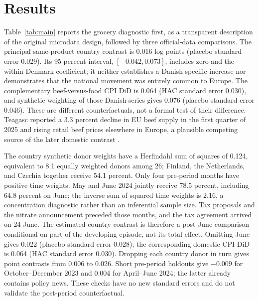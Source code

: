 \documentclass[11pt]{article}
\begin{document}
\section{Results}\label{sec:results}
Table~\ref{tab:main} reports the grocery diagnostic first, as a transparent description of the original microdata design, followed by three official-data comparisons. The principal same-product country contrast is 0.016 log points (placebo standard error 0.029). Its 95 percent interval, $[-0.042,0.073]$, includes zero and the within-Denmark coefficient; it neither establishes a Danish-specific increase nor demonstrates that the national movement was entirely common to Europe. The complementary beef-versus-food CPI DiD is 0.064 (HAC standard error 0.030), and synthetic weighting of those Danish series gives 0.076 (placebo standard error 0.046). These are different counterfactuals, not a formal test of their difference. Teagasc reported a 3.3 percent decline in EU beef supply in the first quarter of 2025 and rising retail beef prices elsewhere in Europe, a plausible competing source of the later domestic contrast \citep{teagasc2025beef}.

The country synthetic donor weights have a Herfindahl sum of squares of 0.124, equivalent to 8.1 equally weighted donors among 26; Finland, the Netherlands, and Czechia together receive 54.1 percent. Only four pre-period months have positive time weights. May and June 2024 jointly receive 78.5 percent, including 64.8 percent on June; the inverse sum of squared time weights is 2.16, a concentration diagnostic rather than an inferential sample size. Tax proposals and the nitrate announcement preceded those months, and the tax agreement arrived on 24 June. The estimated country contrast is therefore a post-June comparison conditional on part of the developing episode, not its total effect. Omitting June gives 0.022 (placebo standard error 0.028); the corresponding domestic CPI DiD is 0.064 (HAC standard error 0.030). Dropping each country donor in turn gives point contrasts from 0.006 to 0.026. Short pre-period holdouts give $-0.009$ for October--December 2023 and 0.004 for April--June 2024; the latter already contains policy news. These checks have no new standard errors and do not validate the post-period counterfactual.
\end{document}
